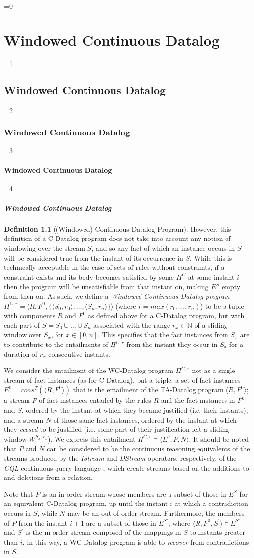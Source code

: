 \documentclass[twocolumn,preprint,3p,number]{elsarticle}
\theoremstyle{plain}
\theoremstyle{definition}
\newtheorem{definition}{Definition}
\newcounter{nestingdepth}
\newenvironment{nestedsection}[2]{
  \ifnum\value{nestingdepth}=0
    \chapter{#1}
  \else
    \ifnum\value{nestingdepth}=1
      \section{#1}
    \else
      \ifnum\value{nestingdepth}=2
        \subsection{#1}
      \else
        \ifnum\value{nestingdepth}=3
          \subsubsection{#1}
        \else
          \ifnum\value{nestingdepth}=4
            \paragraph{#1}
          \else
            \PackageError{nestedsections}{Maximum nesting level exceeded!}{uh oh!}
          \fi
        \fi
      \fi
    \fi
  \fi
  \addtocounter{nestingdepth}{1}
  \label{sec:#2}
}{\addtocounter{nestingdepth}{-1}}
\begin{document}
\begin{nestedsection}{Windowed Continuous Datalog}{semantics}
\begin{definition}[(Windowed) Continuous Datalog Program]
However, this definition of a C-Datalog program does not take into
account any notion of windowing over the stream $S$, and so any fact of
which an instance occurs in $S$ will be considered true from the instant
of its occurrence in $S$.  While this is technically acceptable in the
case of sets of rules without constraints, if a constraint exists and its
body becomes satisfied by some $\Pi^C$ at some instant $i$ then the
program will be unsatisfiable from that instant on, making $E^S$ empty
from then on.  As such, we define a {\em Windowed Continuous Datalog program}
$\Pi^{C, r} = \langle R, F^0, \{\langle S_0, r_0 \rangle,\dots,\langle S_n, r_n \rangle\} \rangle$
(where $r = max(r_0,\dots,r_n)$) to be a tuple with components $R$ and $F^0$ as defined above for a
C-Datalog program, but with each part of $S = S_0 \cup \dots \cup S_n$
associated with the range $r_x \in \mathbb{N}$ of a sliding window over
$S_x$, for $x \in [0,n]$. This specifies that the fact instances
from $S_x$ are to contribute to the entailments of $\Pi^{C,r}$ from the instant
they occur in $S_x$ for a duration of $r_x$ consecutive instants.

We consider the entailment of the WC-Datalog program $\Pi^{C,r}$ not
as a single stream of fact instances (as for C-Datalog), but a triple: a
set of fact instances $E^0 = cons^T(\langle R, F^0\rangle)$ that is the
entailment of the TA-Datalog program $\langle R, F^0\rangle$; a stream
$P$ of fact instances entailed by the rules $R$ and the fact instances in
$F^0$ and $S$, ordered by the instant at which they became justified (i.e.
their instants); and a stream $N$ of those same fact instances, ordered by
the instant at which they \emph{ceased} to be justified (i.e. some part of
their justification left a sliding window $W^{S_x,r_x}$). We express this
entailment $\Pi^{C,r} \models \langle E^0, P, N \rangle$.
It should be noted that $P$ and $N$ can be considered to be the continuous
reasoning equivalents of the streams produced by the \emph{IStream} and
\emph{DStream} operators, respectively, of the \emph{CQL} continuous query
language \citep{CQL}, which create streams based on the additions to and
deletions from a relation.

Note that $P$ is an in-order stream whose members are a subset
of those in $E^S$ for an equivalent C-Datalog program, up until the instant $i$
at which a contradiction occurs in $S$, while $N$ may be an out-of-order
stream. Furthermore, the members of $P$ from the instant $i+1$ are a subset of
those in $E^{S\prime}$, where $\langle R,F^0,S^\prime \rangle \models E^{S\prime}$
and $S^\prime$ is the in-order stream composed of the mappings in $S$ to instants
greater than $i$. In this way, a WC-Datalog program is able to \emph{recover}
from contradictions in $S$.


\end{definition}
\end{nestedsection}
\end{document}
